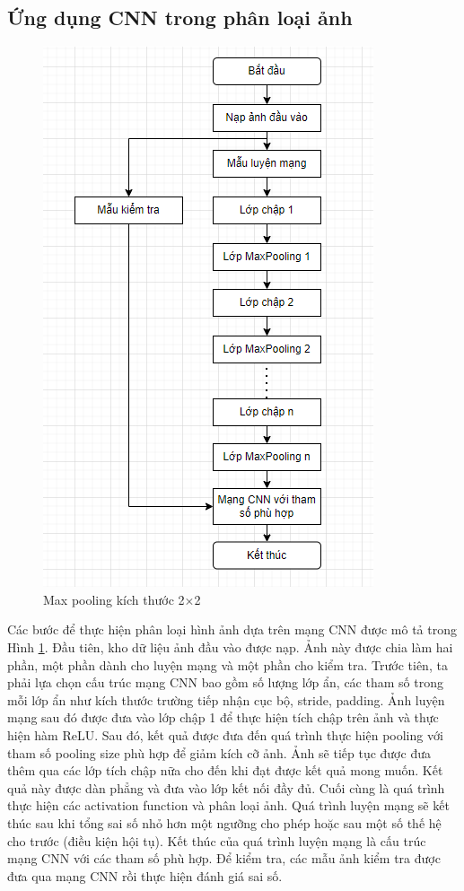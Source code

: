 \subsection{Ứng dụng CNN trong phân loại ảnh}
\begin{figure}[H]
	\centering
	\includegraphics[width=0.8\linewidth]{images/placnn.png}
	\caption{Max pooling kích thước 2×2}
	\label{fig:placnn}
\end{figure}
Các bước để thực hiện phân loại hình ảnh dựa trên mạng CNN được mô tả trong Hình \ref{fig:placnn}. Đầu tiên, kho dữ liệu ảnh đầu vào được nạp. Ảnh này được chia làm hai phần, một phần dành cho luyện mạng và một phần cho kiểm tra. Trước tiên, ta phải lựa chọn cấu trúc mạng CNN bao gồm số lượng lớp ẩn, các tham số trong mỗi lớp ẩn như kích thước trường tiếp nhận cục bộ, stride, padding.  Ảnh luyện mạng sau đó được đưa vào lớp chập 1 để thực hiện tích chập trên ảnh và thực hiện hàm ReLU. Sau đó, kết quả được đưa đến quá trình thực hiện pooling với tham số pooling size phù hợp để giảm kích cỡ ảnh. Ảnh sẽ tiếp tục được đưa thêm qua các lớp tích chập nữa cho đến khi đạt được kết quả mong muốn. Kết quả này được dàn phẳng và đưa vào lớp kết nối đầy đủ. Cuối cùng là quá trình thực hiện các activation function và phân loại ảnh. Quá trình luyện mạng sẽ kết thúc sau khi tổng sai số nhỏ hơn một ngưỡng cho phép hoặc sau một số thế hệ cho trước (điều kiện hội tụ). Kết thúc của quá trình luyện mạng là cấu trúc mạng CNN với các tham số phù hợp. Để kiểm tra, các mẫu ảnh kiểm tra được đưa qua mạng CNN rồi thực hiện đánh giá sai số.

